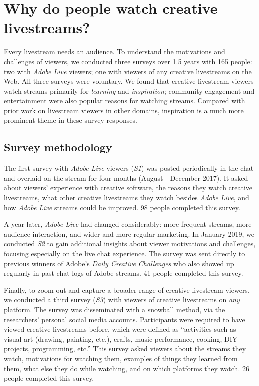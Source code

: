 \section{Why do people watch creative livestreams?}
Every livestream needs an audience. To understand the motivations and challenges of viewers, we conducted three surveys over 1.5 years with 165 people: two with \textit{Adobe Live} viewers; one with viewers of any creative livestreams on the Web. All three surveys were voluntary. We found that creative livestream viewers watch streams primarily for \textit{learning} and \textit{inspiration}; community engagement and entertainment were also popular reasons for watching streams. Compared with prior work on livestream viewers in other domains, inspiration is a much more prominent theme in these survey responses.

\subsection{Survey methodology}
The first survey with \textit{Adobe Live} viewers (\textit{S1}) was posted periodically in the chat and overlaid on the stream for four months (August - December 2017). It asked about viewers' experience with creative software, the reasons they watch creative livestreams, what other creative livestreams they watch besides \textit{Adobe Live}, and how \textit{Adobe Live} streams could be improved. 98 people completed this survey.

A year later, \textit{Adobe Live} had changed considerably: more frequent streams, more audience interaction, and wider and more regular marketing. In January 2019, we conducted \textit{S2} to gain additional insights about viewer motivations and challenges, focusing especially on the live chat experience. The survey was sent directly to previous winners of Adobe's \textit{Daily Creative Challenges} who also showed up regularly in past chat logs of Adobe streams. 41 people completed this survey.

Finally, to zoom out and capture a broader range of creative livestream viewers, we conducted a third survey (\textit{S3}) with viewers of creative livestreams on \textit{any}  platform. The survey was disseminated with a snowball method, via the researchers' personal social media accounts. Participants were required to have viewed creative livestreams before, which were defined as ``activities such as visual art (drawing, painting, etc.), crafts, music performance, cooking, DIY projects, programming, etc.'' This survey asked viewers about the streams they watch, motivations for watching them, examples of things they learned from them, what else they do while watching, and on which platforms they watch. 26 people completed this survey.

